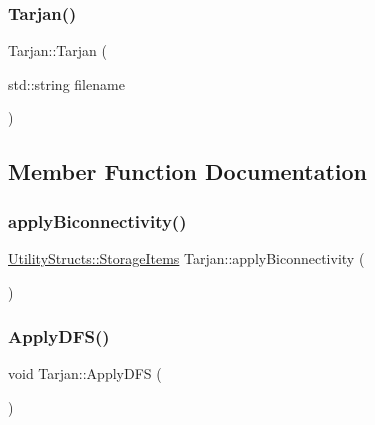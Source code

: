 \mbox{\label{class_tarjan_a7e9845c51e1e905df76b267370c6dc00_a7e9845c51e1e905df76b267370c6dc00}} 
\subsubsection{\texorpdfstring{Tarjan()}{Tarjan()}\hspace{0.1cm}{\footnotesize\ttfamily [2/2]}}
{\footnotesize\ttfamily Tarjan\+::\+Tarjan (\begin{DoxyParamCaption}\item[{std\+::string}]{filename }\end{DoxyParamCaption})\hspace{0.3cm}{\ttfamily [inline]}}



\subsection{Member Function Documentation}
\mbox{\label{class_tarjan_a4be3dec188e347b54a90cd5f37abc268_a4be3dec188e347b54a90cd5f37abc268}} 
\subsubsection{\texorpdfstring{apply\+Biconnectivity()}{applyBiconnectivity()}}
{\footnotesize\ttfamily \hyperlink{struct_utility_structs_1_1_storage_items}{Utility\+Structs\+::\+Storage\+Items} Tarjan\+::apply\+Biconnectivity (\begin{DoxyParamCaption}{ }\end{DoxyParamCaption})}

\mbox{\label{class_tarjan_a674767d7e49ada6a738ab69187e4836d_a674767d7e49ada6a738ab69187e4836d}} 
\subsubsection{\texorpdfstring{Apply\+D\+F\+S()}{ApplyDFS()}}
{\footnotesize\ttfamily void Tarjan\+::\+Apply\+D\+FS (\begin{DoxyParamCaption}{ }\end{DoxyParamCaption})}

